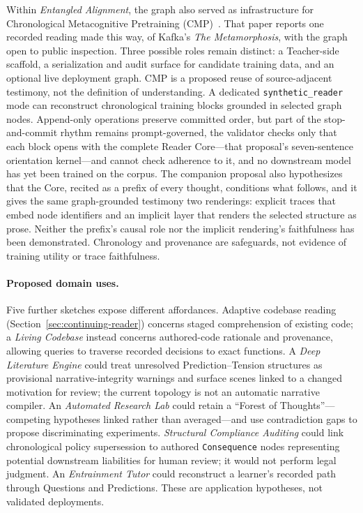 Within \emph{Entangled Alignment}, the graph also served as infrastructure for Chronological Metacognitive Pretraining (CMP)~\cite{westerberg2026entangled}. That paper reports one recorded reading made this way, of Kafka's \emph{The Metamorphosis}, with the graph open to public inspection. Three possible roles remain distinct: a Teacher-side scaffold, a serialization and audit surface for candidate training data, and an optional live deployment graph. CMP is a proposed reuse of source-adjacent testimony, not the definition of understanding. A dedicated \texttt{synthetic\_reader} mode can reconstruct chronological training blocks grounded in selected graph nodes. Append-only operations preserve committed order, but part of the stop-and-commit rhythm remains prompt-governed, the validator checks only that each block opens with the complete Reader Core---that proposal's seven-sentence orientation kernel---and cannot check adherence to it, and no downstream model has yet been trained on the corpus. The companion proposal also hypothesizes that the Core, recited as a prefix of every thought, conditions what follows, and it gives the same graph-grounded testimony two renderings: explicit traces that embed node identifiers and an implicit layer that renders the selected structure as prose. Neither the prefix's causal role nor the implicit rendering's faithfulness has been demonstrated. Chronology and provenance are safeguards, not evidence of training utility or trace faithfulness.

\paragraph{Proposed domain uses.} Five further sketches expose different affordances. Adaptive codebase reading (Section~\ref{sec:continuing-reader}) concerns staged comprehension of existing code; a \emph{Living Codebase} instead concerns authored-code rationale and provenance, allowing queries to traverse recorded decisions to exact functions. A \emph{Deep Literature Engine} could treat unresolved Prediction--Tension structures as provisional narrative-integrity warnings and surface scenes linked to a changed motivation for review; the current topology is not an automatic narrative compiler. An \emph{Automated Research Lab} could retain a ``Forest of Thoughts''---competing hypotheses linked rather than averaged---and use contradiction gaps to propose discriminating experiments. \emph{Structural Compliance Auditing} could link chronological policy supersession to authored \texttt{Consequence} nodes representing potential downstream liabilities for human review; it would not perform legal judgment. An \emph{Entrainment Tutor} could reconstruct a learner's recorded path through Questions and Predictions. These are application hypotheses, not validated deployments.

